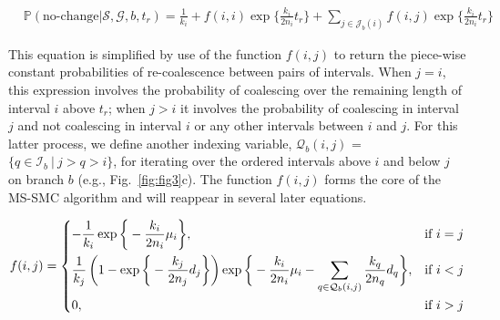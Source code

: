 \documentclass[11pt]{article}
\begin{document}
\begin{equation}
\begin{aligned}
	&\mathbb{P}(\text{no-change} | \mathcal{S},\mathcal{G},b,t_r) = 
	\frac{1}{k_i} + 
	f(i,i) \exp \bigg\{ \frac{k_i}{2n_i} t_r \bigg\} +
	\sum_{j \in \mathcal{J}_b(i)} f(i,j) \exp \bigg\{ \frac{k_i}{2n_i} t_r\bigg\}
\end{aligned}
\end{equation}


\noindent This equation is simplified by use of the function $f(i,j)$
to return the piece-wise constant probabilities of re-coalescence between
pairs of intervals. When $j=i$, this expression involves the probability of 
coalescing over the remaining length of interval $i$ above $t_r$; 
when $j>i$ it involves the probability of coalescing in interval 
$j$ and not coalescing in interval $i$ or any other intervals 
between $i$ and $j$. For this latter process, we define another
indexing variable, $\mathcal{Q}_b(i,j)$ = $\{q \in \mathcal{I}_b ~|~ j > q > i\}$, 
for iterating over the ordered intervals above $i$ and below $j$ 
on branch $b$ (e.g., Fig.~\ref{fig:fig3}c).
The function $f(i,j)$ forms the core of the MS-SMC algorithm and 
will reappear in several later equations.

\begin{equation}
\begin{aligned}	
	f(i,j) = 
	\begin{dcases}
		- \frac{1}{k_i} \exp \bigg\{-\frac{k_i}{2n_i}\mu_i \bigg\}, 
		& \text{if } i=j\\
		\frac{1}{k_j} \left(1 - \exp \bigg\{ -\frac{k_j}{2n_j} d_j \bigg\} 
		\right)
		\exp \bigg\{ -\frac{k_i}{2n_i}\mu_i - 
		\sum_{q \in \mathcal{Q}_b(i,j)} \frac{k_q}{2n_q} d_q \bigg \}, 
		& \text{if } i<j\\
		0, 
		& \text{if } i>j\\
	\end{dcases}
\end{aligned}
\end{equation}

\end{document}
